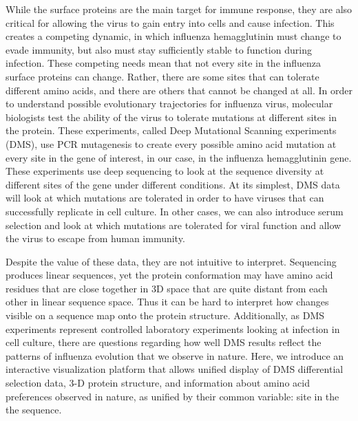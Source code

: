 \documentclass[sigchi]{acmart}
\begin{document}
While the surface proteins are the main target for immune response, they are also critical for allowing the virus to gain entry into cells and cause infection. This creates a competing dynamic, in which influenza hemagglutinin must change to evade immunity, but also must stay sufficiently stable to function during infection. These competing needs mean that not every site in the influenza surface proteins can change. Rather, there are some sites that can tolerate different amino acids, and there are others that cannot be changed at all. In order to understand possible evolutionary trajectories for influenza virus, molecular biologists test the ability of the virus to tolerate mutations at different sites in the protein. These experiments, called Deep Mutational Scanning experiments (DMS), use PCR mutagenesis to create every possible amino acid mutation at every site in the gene of interest, in our case, in the influenza hemagglutinin gene. These experiments use deep sequencing to look at the sequence diversity at different sites of the gene under different conditions. At its simplest, DMS data will look at which mutations are tolerated in order to have viruses that can successfully replicate in cell culture. In other cases, we can also introduce serum selection and look at which mutations are tolerated for viral function and allow the virus to escape from human immunity.

Despite the value of these data, they are not intuitive to interpret. Sequencing produces linear sequences, yet the protein conformation may have amino acid residues that are close together in 3D space that are quite distant from each other in linear sequence space. Thus it can be hard to interpret how changes visible on a sequence map onto the protein structure. Additionally, as DMS experiments represent controlled laboratory experiments looking at infection in cell culture, there are questions regarding how well DMS results reflect the patterns of influenza evolution that we observe in nature. Here, we introduce an interactive visualization platform that allows unified display of DMS differential selection data, 3-D protein structure, and information about amino acid preferences observed in nature, as unified by their common variable: site in the the sequence.
\end{document}
